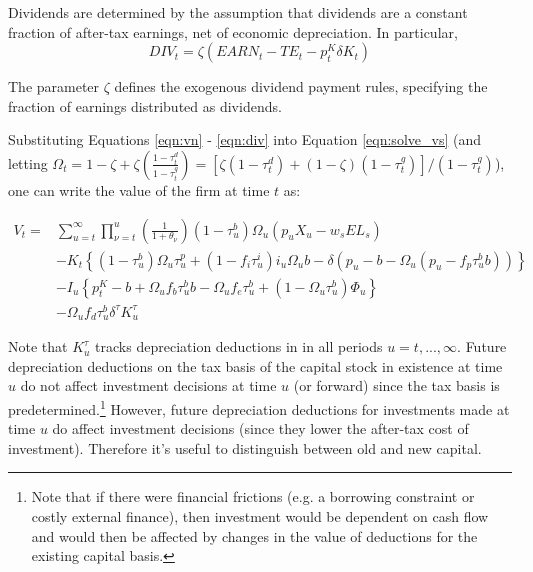 Dividends are determined by the assumption that dividends are a constant fraction of after-tax earnings, net of economic depreciation.  In particular, 
\begin{equation}
\label{eqn:div}
DIV_{t}=\zeta(EARN_{t}-TE_{t}-p^{K}_{t}\delta K_{t})
\end{equation}

\noindent\noindent The parameter $\zeta$ defines the exogenous dividend payment rules, specifying the fraction of earnings distributed as dividends. 

Substituting Equations \ref{eqn:vn} - \ref{eqn:div} into Equation \ref{eqn:solve_vs}  (and letting $\Omega_{t}=1 - \zeta + \zeta\left(\frac{1-\tau^{d}_{t}}{1-\tau^{g}_{t}}\right) = \left[\zeta(1-\tau^{d}_{t}) + (1-\zeta)(1-\tau^{g}_{t})\right]/(1-\tau^{g}_{t})$), one can write the value of the firm at time $t$ as:

\begin{equation}
\label{eqn:vs}
\begin{split}
V_{t} = &  \sum_{u=t}^{\infty} \prod_{\nu=t}^{u}\left(\frac{1}{1+\theta_{\nu}}\right) (1-\tau^{b}_{u})\Omega_{u}(p_{u}X_{u}-w_{s}EL_{s})  \\ 
 & - K_{t} \left\{(1-\tau^{b}_{u})\Omega_{u}\tau^{p}_{u}+(1-f_{i}\tau^{i}_{u})i_{u}\Omega_{u}b-\delta(p_{u}-b-\Omega_{u}(p_{u}-f_{p}\tau^{b}_{u}b))\right\}  \\
 & - I_{u}\left\{p^{K}_{t}-b+\Omega_{u}f_{b}\tau^{b}_{u}b-\Omega_{u}f_{e}\tau^{b}_{u} + (1-\Omega_{u}\tau^{b}_{u})\Phi_{u}\right\} \\
 & - \Omega_{u}f_{d}\tau^{b}_{u}\delta^{\tau}K^{\tau}_{u}
\end{split}
\end{equation}

\noindent\noindent Note that $K^{\tau}_{u}$ tracks depreciation deductions in in all periods $u=t,...,\infty$.  Future depreciation deductions on the tax basis of the capital stock in existence at time $u$ do not affect investment decisions at time $u$ (or forward) since the tax basis is predetermined.\footnote{Note that if there were financial frictions (e.g. a borrowing constraint or costly external finance), then investment would be dependent on cash flow and would then be affected by changes in the value of deductions for the existing capital basis.}  However, future depreciation deductions for investments made at time $u$ do affect investment decisions (since they lower the after-tax cost of investment).  Therefore it's useful to distinguish between old and new capital. 

